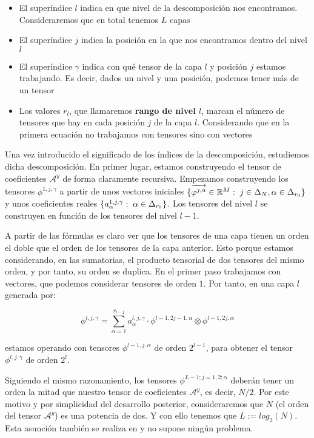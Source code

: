 \begin{itemize}
	\item El superíndice $l$ indica en que nivel de la descomposición nos encontramos. Consideraremos que en total tenemos $L$ capas
	\item El superíndice $j$ indica la posición en la que nos encontramos dentro del nivel $l$
	\item El superíndice $\gamma$ indica con qué tensor de la capa $l$ y posición $j$ estamos trabajando. Es decir, dados un nivel y una posición, podemos tener más de un tensor
	\item Los valores $r_l$, que llamaremos \textbf{rango de nivel $l$}, marcan el número de tensores que hay en cada posición $j$ de la capa $l$. Considerando que en la primera ecuación no trabajamos con tensores sino con vectores
\end{itemize}

Una vez introducido el significado de los índices de la descomposición, estudiemos dicha descomposición. En primer lugar, estamos construyendo el tensor de coeficientes $\mathcal{A}^y$ de forma claramente recursiva. Empezamos construyendo los tensores $\phi^{1, j, \gamma}$ a partir de unos vectores iniciales $\{\overrightarrow{\varphi^{j, \alpha}} \in \mathbb{R}^M: \; j \in \Delta_{N}, \alpha \in \Delta_{r_0}  \}$  y unos coeficientes reales $\{a_{\alpha}^{1, j, \gamma}: \; \alpha \in \Delta_{r_0}\}$. Los tensores del nivel $l$ se construyen en función de los tensores del nivel $l-1$.

A partir de las fórmulas es claro ver que los tensores de una capa tienen un orden el doble que el orden de los tensores de la capa anterior. Esto porque estamos considerando, en las sumatorias, el producto tensorial de dos tensores del mismo orden, y por tanto, su orden se duplica. En el primer paso trabajamos con vectores, que podemos considerar tensores de orden $1$. Por tanto, en una capa $l$ generada por:

\begin{equation}
	\phi^{l, j, \gamma} = \sum_{\alpha = 1}^{r_{l-1}} a_{\alpha}^{l, j, \gamma} \cdot \phi^{l-1, 2j-1, \alpha} \otimes \phi^{l-1, 2j, \alpha}
\end{equation}

estamos operando con tensores $\phi^{l-1, j, \alpha}$ de orden $2^{l-1}$, para obtener el tensor $\phi^{l, j, \gamma}$ de orden $2^l$.

Siguiendo el mismo razonamiento, los tensores $\phi^{L-1; j = 1, 2; \alpha}$ deberán tener un orden la mitad que nuestro tensor de coeficientes $\mathcal{A}^y$, es decir, $N / 2$. Por este motivo y por simplicidad del desarrollo posterior, consideraremos que $N$ (el orden del tensor $\mathcal{A}^y$) es una potencia de dos. Y con ello tenemos que $L := log_2(N)$. Esta asunción también se realiza en \cite{matematicas:descomposicion_ht} y no supone ningún problema.

